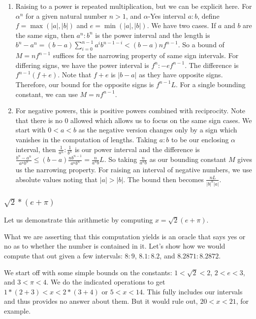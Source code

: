 \documentclass[12pt]{article}
\theoremstyle{remark}
\begin{document}
\begin{enumerate}
    \item Raising to a power is repeated multiplication, but we can be explicit here. For $\alpha^n$ for a given natural number $n>1$, and $\alpha$-Yes interval $a:b$, define $f = \max(|a|, |b|)$ and $e=\min(|a|,|b|)$.  We have two cases. If $a$ and $b$ are the same sign, then $a^n:b^n$ is the power interval and the length is $b^n - a^n = (b-a)\sum_{i=0}^{n-1} a^i b^{n-1-i} < (b-a)n f^{n-1}$. So a bound of $M= nf^{n-1}$ suffices for the narrowing property of same sign intervals. For differing signs, we have the power interval is $f^n:-ef^{n-1}$. The difference is $f^{n-1} (f+e)$. Note that $f+e$ is $|b-a|$ as they have opposite signs. Therefore, our bound for the opposite signs is $f^{n-1} L$. For a single bounding constant, we can use $M = n f^{n-1}$.
    \item For negative powers, this is positive powers combined with reciprocity. Note that there is no 0 allowed which allows us to focus on the same sign cases. We start with $0 < a < b$ as the negative version changes only by a sign which vanishes in the computation of lengths.  Taking $a:b$ to be our enclosing $\alpha$ interval, then $\frac{1}{a^n} : \frac{1}{b^n}$ is our power interval and the difference is $\frac{b^n-a^n}{a^n b^n} \leq (b-a) \frac{n b^{n-1}}{a^n b^n} = \frac{n}{a^n b} L$. So taking $\frac{n}{a^n b}$ as our bounding constant $M$ gives us the narrowing property.  For raising an interval of negative numbers, we use absolute values noting that  $|a|>|b|$. The bound then becomes $\frac{nL}{|b|^n |a|}$.
\end{enumerate}

\subsubsection{$\sqrt{2}*(e + \pi)$}

Let us demonstrate this arithmetic by computing $x = \sqrt{2}(e + \pi)$. 

What we are asserting that this computation yields is an oracle that says yes or no as to whether the number is contained in it. Let's show how we would compute that out given a few intervals:  $8:9$, $8.1:8.2$, and $8.2871:8.2872$.

We start off with some simple bounds on the constants: $1 < \sqrt{2} < 2$, $2<e<3$, and $3 < \pi<4$. We do the indicated operations to get $1*(2+3) < x < 2*(3+4)$ or $5 < x< 14$. This fully includes our intervals and thus provides no answer about them. But it would rule out, $20 < x< 21$, for example. 
\end{document}
